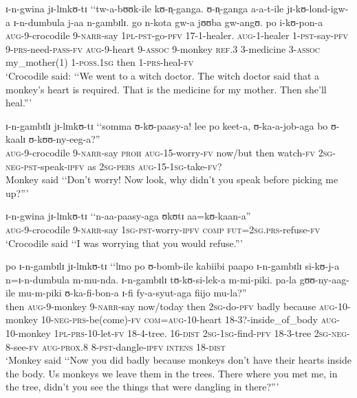 \begin{exe}
\ex \gll ɪ-n-gwina jɪ-lɪnkʊ-tɪ \lq\lq tw-a-bʊʊk-ile kʊ-n̩-ganga. ʊ-n̩-ganga a-a-t-ile jɪ-kʊ-lond-igw-a ɪ-n-dumbula j-aa n-gambɪlɪ. go n-kota gw-a jʊʊba gw-angʊ. po i-kʊ-pon-a\\
\textsc{aug}-9-crocodile 9-\textsc{narr}-say \phantom{\lq\lq}\textsc{1pl}-\textsc{pst}-go-\textsc{pfv} 17-1-healer. \textsc{aug}-1-healer 1-\textsc{pst}-say-\textsc{pfv} 9-\textsc{prs}-need-\textsc{pass}-\textsc{fv} \textsc{aug}-9-heart 9-\textsc{assoc} 9-monkey \textsc{ref.3} 3-medicine 3-\textsc{assoc} my\_mother(1) 1-\textsc{poss.1sg} then 1-\textsc{prs}-heal-\textsc{fv}\\
\glt \lq Crocodile said: \lq\lq We went to a witch doctor. The witch doctor said that a monkey's heart is required. That is the medicine for my mother. Then she'll heal.''{}'

\ex \gll ɪ-n-gambɪlɪ jɪ-lɪnkʊ-tɪ \lq\lq somma ʊ-kʊ-paasy-a! lee po keet-a, ʊ-ka-a-job-aga bo ʊ-kaalɪ ʊ-kʊʊ-ny-eeg-a?''\\
\textsc{aug}-9-crocodile 9-\textsc{narr}-say \phantom{\lq\lq}\textsc{proh} \textsc{aug}-15-worry-\textsc{fv} now/but then watch-\textsc{fv} \textsc{2sg}-\textsc{neg}-\textsc{pst}-speak-\textsc{ipfv} as \textsc{2sg}-\textsc{pers} \textsc{aug}-15-\textsc{1sg}-take-\textsc{fv}?\\
\glt Monkey said \lq\lq Don't worry! Now look, why didn't you speak before picking me up?''{}'

\ex \gll ɪ-n-gwina jɪ-lɪnkʊ-tɪ \lq\lq n-aa-paasy-aga ʊkʊtɪ aa=kʊ-kaan-a''\\
\textsc{aug}-9-crocodile 9-\textsc{narr}-say \phantom{\lq\lq}\textsc{1sg}-\textsc{pst}-worry-\textsc{ipfv} \textsc{comp} \textsc{fut}=\textsc{2sg.prs}-refuse-\textsc{fv}\\
\glt \lq Crocodile said \lq\lq I was worrying that you would refuse.''{}'

\ex \gll po ɪ-n-gambɪlɪ jɪ-lɪnkʊ-tɪ \lq\lq lɪno po ʊ-bomb-ile kabiibi paapo ɪ-n-gambɪlɪ si-kʊ-j-a n=ɪ-n-dumbula m-mu-nda. ɪ-n-gambɪlɪ tʊ-kʊ-si-lek-a m-mi-piki. pa-la gʊʊ-ny-aag-ile mu-m-piki ʊ-ka-fi-bon-a ɪ-fi fy-a-syut-aga fiijo mu-la?''\\
then \textsc{aug}-9-monkey 9-\textsc{narr}-say \phantom{\lq\lq}now/today then \textsc{2sg}-do-\textsc{pfv} badly because \textsc{aug}-10-monkey 10-\textsc{neg}-\textsc{prs}-be(come)-\textsc{fv} \textsc{com}=\textsc{aug}-10-heart 18-3?-inside\_of\_body \textsc{aug}-10-monkey \textsc{1pl}-\textsc{prs}-10-let-\textsc{fv} 18-4-tree. 16-\textsc{dist} \textsc{2sg}-\textsc{1sg}-find-\textsc{pfv} 18-3-tree \textsc{2sg}-\textsc{neg}-8-see-\textsc{fv} \textsc{aug}-\textsc{prox.8} 8-\textsc{pst}-dangle-\textsc{ipfv} \textsc{intens} 18-\textsc{dist}\\
\glt \lq Monkey said \lq\lq Now you did badly because monkeys don't have their hearts inside the body. Us monkeys we leave them in the trees. There where you met me, in the tree, didn't you see the things that were dangling in there?''{}'


\end{exe}

